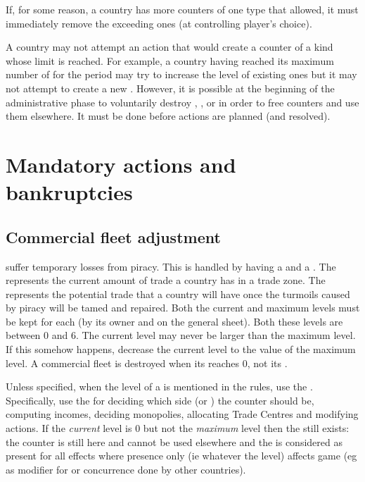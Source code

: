 \aparag If, for some reason, a country has more counters of one type that
allowed, it must immediately remove the exceeding ones (at controlling
player's choice).

\aparag A country may not attempt an action that would create a counter of a
kind whose limit is reached. For example, a country having reached its maximum
number of \COL for the period may try to increase the level of existing ones
but it may not attempt to create a new \COL.
\bparag However, it is possible at the beginning of the administrative phase
to voluntarily destroy \COL, \TP, \MNU or \TradeFLEET in order to free
counters and use them elsewhere. It must be done before actions are planned
(and resolved).




\section{Mandatory actions and bankruptcies}



\subsection{Commercial fleet adjustment}\label{chExpenses:Commercial Fleet
  Adjustment}

 \TradeFLEET suffer temporary losses from
piracy. This is handled by having a  and a .
\bparag The  represents the current amount of trade a
country has in a trade zone.
\bparag The  represents the potential trade that a
country will have once the turmoils caused by piracy will be tamed and
repaired.
\bparag Both the current and maximum levels must be kept for each \TradeFLEET
(by its owner and on the general \TradeFLEET sheet).
\bparag Both these levels are between 0 and 6.
\bparag The current level may never be larger than the maximum level. If this
somehow happens, decrease the current level to the value of the maximum level.
\bparag A commercial fleet is destroyed when its  reaches
0, not its .

 Unless specified, when the level of a \TradeFLEET is
mentioned in the rules, use the .
\bparag Specifically, use the  for deciding which side
(\Facemoins or \Faceplus) the counter should be, computing incomes, deciding
monopolies, allocating Trade Centres and modifying \TFI actions.
\bparag If the \emph{current} level is 0 but not the \emph{maximum} level then
the \TradeFLEET still exists: the counter is still here and cannot be used
elsewhere and the \TradeFLEET is considered as present for all effects where
presence only (ie whatever the level) affects game (eg as modifier for \TFI or
concurrence done by other countries).

